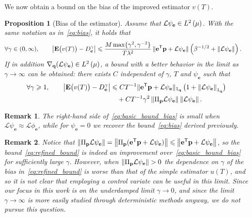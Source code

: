 \documentclass[11pt,a4paper]{article}
\newcommand{\expect}[0]{\mathbf{E}}
\newcommand{\grad}{\nabla}
\newcommand{\vect}[1]{\boldsymbol{\mathbf #1}}
\renewcommand{\t}{\mathsf T}
\theoremstyle{plain}
\newtheorem{proposition}{Proposition}[section]
\newtheorem{remark}{Remark}[section]
\numberwithin{equation}{section}
\renewcommand{\leq}{\leqslant}
\renewcommand{\geq}{\geqslant}
\begin{document}
We now obtain a bound on the bias of the improved estimator $v(T)$.
\begin{proposition}
    [Bias of the estimator]
    Assume that $\mathcal L \psi_{\vect e} \in \lp{2}{\mu}$.
    With the same notation as in~\eqref{eq:bias},
    it holds that
    \begin{align}
        \label{eq:basic_bound_bias}
        \forall \gamma \in (0, \infty), \qquad
        \abs{\expect \bigl( v(T) \bigr) - D^{\gamma}_{\vect e}}
                &\leq  \frac{M \max\{\gamma^2, \gamma^{-2}\}}{T \lambda^2 }  \,  \norm*{\vect e^\t \vect p + \mathcal L \psi_{\vect e}}  \left(\beta^{-1/2} + \norm{\mathcal L \psi_{\vect e}} \right).
    \end{align}
    If in addition $\grad_{\vect q} (\mathcal L \psi_{\vect e}) \in \lp{2}{\mu}$,
    a bound with a better behavior in the limit as $\gamma \to \infty$ can be obtained:
    there exists $C$ independent of $\gamma$, $T$ and $\psi_{\vect e}$ such that
    \begin{align}
        \notag
        \forall \gamma \geq 1, \qquad
        \abs{\expect \bigl( v(T) \bigr) - D_{\vect e}^{\gamma}}
            &\leq C T^{-1}
            \norm*{\vect e^\t \vect p +  \mathcal L \psi_{\vect e}}[1_{\vect q}] \, \bigl(1 + \norm{\mathcal L \psi_{\vect e}}[1_{\vect q}] \bigr) \\
            \label{eq:refined_bound}
            &\quad + C T^{-1} \gamma^2 \norm{\Pi_{\vect p} \mathcal L \psi_{\vect e}} \norm{\mathcal L \psi_{\vect e}}.
    \end{align}
\end{proposition}
\begin{remark}
    The right-hand side of~\eqref{eq:basic_bound_bias} is small when $\mathcal L \psi_{\vect e} \approx \mathcal L \phi_{\vect e}$,
    while for $\psi_{\vect e} = 0$ we recover the bound~\eqref{eq:bias} derived previously.
\end{remark}
\begin{remark}
    Notice that $\norm{\Pi_{\vect p} \mathcal L \psi_{\vect e}} = \norm{\Pi_{\vect p} (\vect e^\t \vect p + \mathcal L \psi_{\vect e})} \leq \norm{\vect e^\t \vect p + \mathcal L \psi_{\vect e}}$,
    so the bound~\eqref{eq:refined_bound} is indeed an improvement over~\eqref{eq:basic_bound_bias} for sufficiently large $\gamma$.
    However, when $\norm{\Pi_{\vect p} \mathcal L \psi_{\vect e}} > 0$ the dependence on $\gamma$ of the bias in~\eqref{eq:refined_bound} is worse than that of the simple estimator $u(T)$,
    and so it is not clear that employing a control variate can be useful in this limit.
    Since our focus in this work is on the underdamped limit $\gamma \to 0$,
    and since the limit $\gamma \to \infty$ is more easily studied through deterministic methods anyway,
    we do not pursue this question.
\end{remark}
\end{document}
